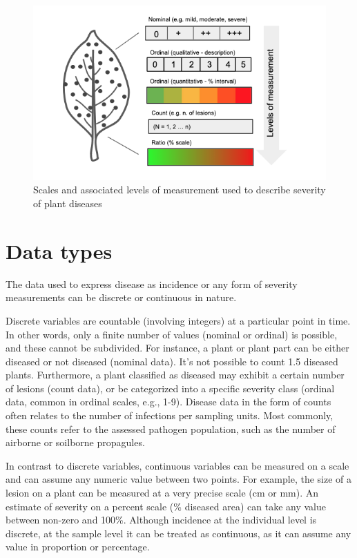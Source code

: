 \documentclass[
  letterpaper,
]{book}
\begin{document}
\begin{figure}

{\centering \includegraphics[width=5.32292in,height=\textheight]{imgs/severity.png}

}

\caption{\label{fig-severity}Scales and associated levels of measurement
used to describe severity of plant diseases}

\end{figure}

\hypertarget{data-types}{%
\section{Data types}\label{data-types}}

The data used to express disease as incidence or any form of severity
measurements can be discrete or continuous in nature.

Discrete variables are countable (involving integers) at a particular
point in time. In other words, only a finite number of values (nominal
or ordinal) is possible, and these cannot be subdivided. For instance, a
plant or plant part can be either diseased or not diseased (nominal
data). It's not possible to count 1.5 diseased plants. Furthermore, a
plant classified as diseased may exhibit a certain number of lesions
(count data), or be categorized into a specific severity class (ordinal
data, common in ordinal scales, e.g., 1-9). Disease data in the form of
counts often relates to the number of infections per sampling units.
Most commonly, these counts refer to the assessed pathogen population,
such as the number of airborne or soilborne propagules.

In contrast to discrete variables, continuous variables can be measured
on a scale and can assume any numeric value between two points. For
example, the size of a lesion on a plant can be measured at a very
precise scale (cm or mm). An estimate of severity on a percent scale (\%
diseased area) can take any value between non-zero and 100\%. Although
incidence at the individual level is discrete, at the sample level it
can be treated as continuous, as it can assume any value in proportion
or percentage.
\end{document}
